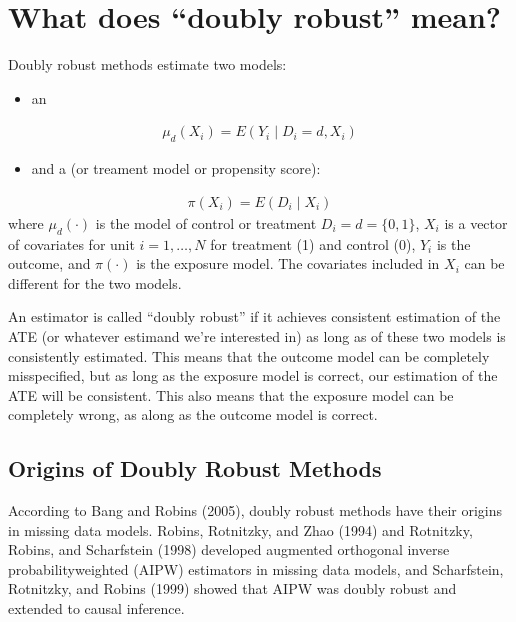 \documentclass[letterpaper,10pt,english]{jupyterBook}
\begin{document}
\chapter{What does “doubly robust” mean?}
\label{\detokenize{Introduction and Conceptual Overview:what-does-doubly-robust-mean}}\label{\detokenize{Introduction and Conceptual Overview::doc}}
\sphinxAtStartPar
Doubly robust methods estimate two models:
\begin{itemize}
\item {} 
\sphinxAtStartPar
an 

\end{itemize}
\begin{equation*}
\begin{split}\mu_d(X_i) = E(Y_i \mid D_i = d, X_i)\end{split}
\end{equation*}\begin{itemize}
\item {} 
\sphinxAtStartPar
and a  (or treament model or propensity score):

\end{itemize}
\begin{equation*}
\begin{split}\pi(X_i) = E(D_i \mid X_i)\end{split}
\end{equation*}
\sphinxAtStartPar
where \(\mu_d(\cdot)\) is the model of control or treatment \(D_i = d=\{0, 1\}\), \(X_i\) is a vector of covariates for unit \(i = 1, \ldots, N\) for treatment (1) and control (0), \(Y_i\) is the outcome, and \(\pi(\cdot)\) is the exposure model. The covariates included in \(X_i\) can be different for the two models.

\sphinxAtStartPar
An estimator is called “doubly robust” if it achieves consistent estimation of the ATE (or whatever estimand we’re interested in) as long as  of these two models is consistently estimated. This means that the outcome model can be completely misspecified, but as long as the exposure model is correct, our estimation of the ATE will be consistent. This also means that the exposure model can be completely wrong, as along as the outcome model is correct.


\section{Origins of Doubly Robust Methods}
\label{\detokenize{Introduction and Conceptual Overview:origins-of-doubly-robust-methods}}
\sphinxAtStartPar
According to Bang and Robins (2005), doubly robust methods have their origins in missing data models. Robins, Rotnitzky, and Zhao (1994) and Rotnitzky, Robins, and Scharfstein (1998) developed augmented orthogonal inverse probability\sphinxhyphen{}weighted (AIPW) estimators in missing data models, and Scharfstein, Rotnitzky, and Robins (1999) showed that AIPW was doubly robust and extended to causal inference.
\end{document}
